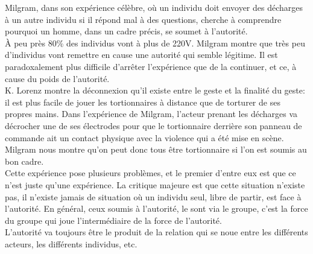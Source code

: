 \documentclass[10pt, a4paper, openany]{book}
\begin{document}
Milgram, dans son expérience célèbre, où un individu doit envoyer des décharges à un autre individu si il répond mal à des questions, cherche à comprendre pourquoi un homme, dans un cadre précis, se soumet à l'autorité. \\
À peu près 80\% des individus vont à plus de 220V. Milgram montre que très peu d'individus vont remettre en cause une autorité qui semble légitime. Il est paradoxalement plus difficile d'arrêter l'expérience que de la continuer, et ce, à cause du poids de l'autorité. \\
K. Lorenz montre la déconnexion qu'il existe entre le geste et la finalité du geste: il est plus facile de jouer les tortionnaires à distance que de torturer de ses propres mains. Dans l'expérience de Milgram, l'acteur prenant les décharges va décrocher une de ses électrodes pour que le tortionnaire derrière son panneau de commande ait un contact physique avec la violence qui a été mise en scène. \\
Milgram nous montre qu'on peut donc tous être tortionnaire si l'on est soumis au bon cadre. \\
Cette expérience pose plusieurs problèmes, et le premier d'entre eux est que ce n'est juste qu'une expérience. La critique majeure est que cette situation n'existe pas, il n'existe jamais de situation où un individu seul, libre de partir, est face à l'autorité. En général, ceux soumis à l'autorité, le sont via le groupe, c'est la force du groupe qui joue l'intermédiaire de la force de l'autorité. \\
L'autorité va toujours être le produit de la relation qui se noue entre les différents acteurs, les différents individus, etc.
\end{document}
